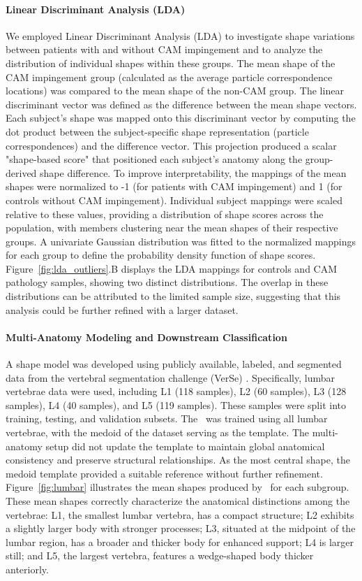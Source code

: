 \paragraph{Linear Discriminant Analysis (LDA)} We employed Linear Discriminant Analysis (LDA) to investigate shape variations between patients with and without CAM impingement and to analyze the distribution of individual shapes within these groups. The mean shape of the CAM impingement group (calculated as the average particle correspondence locations) was compared to the mean shape of the non-CAM group. The linear discriminant vector was defined as the difference between the mean shape vectors. Each subject's shape was mapped onto this discriminant vector by computing the dot product between the subject-specific shape representation (particle correspondences) and the difference vector. This projection produced a scalar "shape-based score" that positioned each subject's anatomy along the group-derived shape difference. To improve interpretability, the mappings of the mean shapes were normalized to -1 (for patients with CAM impingement) and 1 (for controls without CAM impingement). Individual subject mappings were scaled relative to these values, providing a distribution of shape scores across the population, with members clustering near the mean shapes of their respective groups. A univariate Gaussian distribution was fitted to the normalized mappings for each group to define the probability density function of shape scores. Figure~\ref{fig:lda_outliers}.B displays the LDA mappings for controls and CAM pathology samples, showing two distinct distributions. The overlap in these distributions can be attributed to the limited sample size, suggesting that this analysis could be further refined with a larger dataset.


\paragraph{Multi-Anatomy Modeling and Downstream Classification}
A shape model was developed using publicly available, labeled, and segmented data from the vertebral segmentation challenge (VerSe) \cite{sekuboyina2021verse}. Specifically, lumbar vertebrae data were used, including L1 (118 samples), L2 (60 samples), L3 (128 samples), L4 (40 samples), and L5 (119 samples). These samples were split into training, testing, and validation subsets. The \model~was trained using all lumbar vertebrae, with the medoid of the dataset serving as the template. The multi-anatomy setup did not update the template to maintain global anatomical consistency and preserve structural relationships. As the most central shape, the medoid template provided a suitable reference without further refinement. Figure~\ref{fig:lumbar} illustrates the mean shapes produced by \model~for each subgroup. These mean shapes correctly characterize the anatomical distinctions among the vertebrae: L1, the smallest lumbar vertebra, has a compact structure; L2 exhibits a slightly larger body with stronger processes; L3, situated at the midpoint of the lumbar region, has a broader and thicker body for enhanced support; L4 is larger still; and L5, the largest vertebra, features a wedge-shaped body thicker anteriorly.

